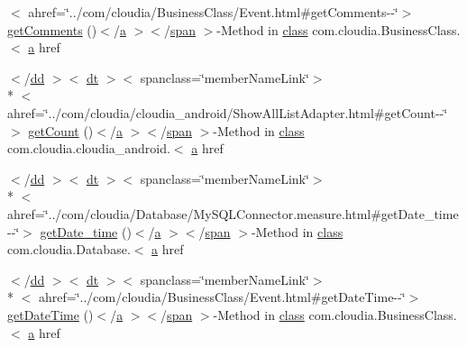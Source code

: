 \begin{DoxyCompactItemize}
$<$ ahref=\char`\"{}../com/cloudia/Business\-Class/Event.\-html\#get\-Comments-\/-\/\char`\"{}$>$ \hyperlink{index-7_8html_a41969187dbb878ba8f5d4f2eb9e27f7c}{get\-Comments} ()$<$/\hyperlink{style_8css_a5e8981582017bb8b84c21f148345d1f7}{a} $>$$<$/\hyperlink{stylesheet_8css_a8343996ebcf16220b04e54659aac31cc}{span} $>$-\/Method in \hyperlink{_tools_8html_acf06f836132665ba8114f5a414c2403f}{class} com.\-cloudia.\-Business\-Class.$<$ \hyperlink{style_8css_a5e8981582017bb8b84c21f148345d1f7}{a} href
\item 
$<$/\hyperlink{stylesheet_8css_a47f4718a86835a7771ec592ece845221}{dd} $>$$<$ \hyperlink{stylesheet_8css_a107565fb4039d33b041380d6e0ea1d80}{dt} $>$$<$ spanclass=\char`\"{}member\-Name\-Link\char`\"{}$>$\\*
$<$ ahref=\char`\"{}../com/cloudia/cloudia\-\_\-android/Show\-All\-List\-Adapter.\-html\#get\-Count-\/-\/\char`\"{}$>$ \hyperlink{index-7_8html_a7c284616a5eb31d0da19daa9db04129f}{get\-Count} ()$<$/\hyperlink{style_8css_a5e8981582017bb8b84c21f148345d1f7}{a} $>$$<$/\hyperlink{stylesheet_8css_a8343996ebcf16220b04e54659aac31cc}{span} $>$-\/Method in \hyperlink{_tools_8html_acf06f836132665ba8114f5a414c2403f}{class} com.\-cloudia.\-cloudia\-\_\-android.$<$ \hyperlink{style_8css_a5e8981582017bb8b84c21f148345d1f7}{a} href
\item 
$<$/\hyperlink{stylesheet_8css_a47f4718a86835a7771ec592ece845221}{dd} $>$$<$ \hyperlink{stylesheet_8css_a107565fb4039d33b041380d6e0ea1d80}{dt} $>$$<$ spanclass=\char`\"{}member\-Name\-Link\char`\"{}$>$\\*
$<$ ahref=\char`\"{}../com/cloudia/Database/My\-S\-Q\-L\-Connector.\-measure.\-html\#get\-Date\-\_\-time-\/-\/\char`\"{}$>$ \hyperlink{index-7_8html_ab0e89fc3303bd356a2070e5126017576}{get\-Date\-\_\-time} ()$<$/\hyperlink{style_8css_a5e8981582017bb8b84c21f148345d1f7}{a} $>$$<$/\hyperlink{stylesheet_8css_a8343996ebcf16220b04e54659aac31cc}{span} $>$-\/Method in \hyperlink{_tools_8html_acf06f836132665ba8114f5a414c2403f}{class} com.\-cloudia.\-Database.$<$ \hyperlink{style_8css_a5e8981582017bb8b84c21f148345d1f7}{a} href
\item 
$<$/\hyperlink{stylesheet_8css_a47f4718a86835a7771ec592ece845221}{dd} $>$$<$ \hyperlink{stylesheet_8css_a107565fb4039d33b041380d6e0ea1d80}{dt} $>$$<$ spanclass=\char`\"{}member\-Name\-Link\char`\"{}$>$\\*
$<$ ahref=\char`\"{}../com/cloudia/Business\-Class/Event.\-html\#get\-Date\-Time-\/-\/\char`\"{}$>$ \hyperlink{index-7_8html_a51e067efa7ed17e26d0498cd52991eec}{get\-Date\-Time} ()$<$/\hyperlink{style_8css_a5e8981582017bb8b84c21f148345d1f7}{a} $>$$<$/\hyperlink{stylesheet_8css_a8343996ebcf16220b04e54659aac31cc}{span} $>$-\/Method in \hyperlink{_tools_8html_acf06f836132665ba8114f5a414c2403f}{class} com.\-cloudia.\-Business\-Class.$<$ \hyperlink{style_8css_a5e8981582017bb8b84c21f148345d1f7}{a} href

\end{DoxyCompactItemize}

